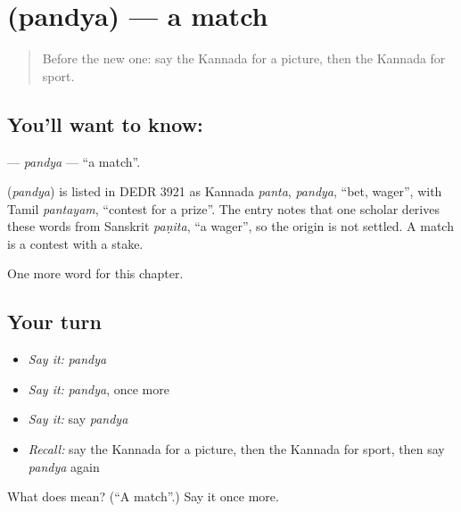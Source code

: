 \section[\texorpdfstring{\kn{ಪಂದ್ಯ} (pandya)}{ಪಂದ್ಯ (pandya)}]{ (pandya) — a match}

\label{lesson:KA-C191-pandya}



\begin{quote}
Before the new one: say the Kannada for a picture, then the Kannada for sport.
\end{quote}

\subsection*{You'll want to know: }
\textbf{} — \emph{pandya} — \textquotedblleft{}a match\textquotedblright{}.

\begin{cousinweb}
\textbf{} (\emph{pandya}) is listed in DEDR 3921 as Kannada \emph{panta}, \emph{pandya}, \textquotedblleft{}bet, wager\textquotedblright{}, with Tamil \emph{pantayam}, \textquotedblleft{}contest for a prize\textquotedblright{}. The entry notes that one scholar derives these words from Sanskrit \emph{paṇita}, \textquotedblleft{}a wager\textquotedblright{}, so the origin is not settled. A match is a contest with a stake.
\end{cousinweb}

\begin{grammarlens}[title={What you've built}]
One more word for this chapter.
\end{grammarlens}

\subsection*{Your turn}
\begin{itemize}
\raggedright
  \item \emph{Say it:} \emph{pandya}
  \item \emph{Say it:} \emph{pandya}, once more
  \item \emph{Say it:} say \emph{pandya}
  \item \emph{Recall:} say the Kannada for a picture, then the Kannada for sport, then say \emph{pandya} again
\end{itemize}

\begin{tcolorbox}[breakable,colback=teal!4,colframe=teal!35!black,title={Before you move on}]
What does  mean? (\textquotedblleft{}A match\textquotedblright{}.) Say it once more.
\end{tcolorbox}
